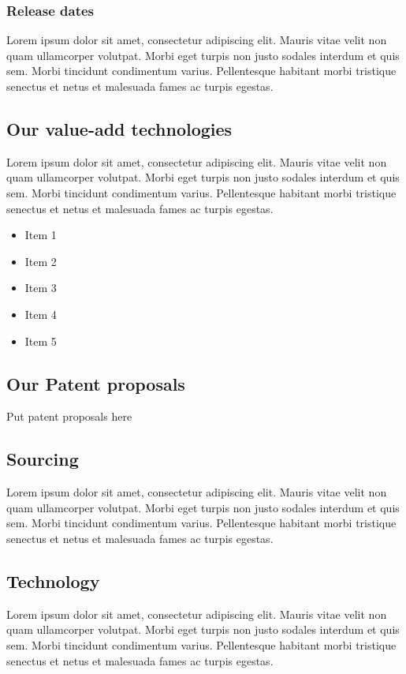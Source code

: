 \documentclass[11pt,titlepage]{article}
\begin{document}
\subsubsection{Release dates}
Lorem ipsum dolor sit amet, consectetur adipiscing elit. Mauris vitae velit 
non quam ullamcorper volutpat. Morbi eget turpis non justo sodales interdum 
et quis sem. Morbi tincidunt condimentum varius. Pellentesque habitant morbi 
tristique senectus et netus et malesuada fames ac turpis egestas.\newline

\subsection{Our value-add technologies}
Lorem ipsum dolor sit amet, consectetur adipiscing elit. Mauris vitae velit 
non quam ullamcorper volutpat. Morbi eget turpis non justo sodales interdum 
et quis sem. Morbi tincidunt condimentum varius. Pellentesque habitant morbi 
tristique senectus et netus et malesuada fames ac turpis egestas.\newline
\begin{itemize}
\item Item 1
\item Item 2
\item Item 3
\item Item 4
\item Item 5
\end{itemize}

\subsection{Our Patent proposals}
Put patent proposals here\newline

\subsection{Sourcing}
Lorem ipsum dolor sit amet, consectetur adipiscing elit. Mauris vitae velit 
non quam ullamcorper volutpat. Morbi eget turpis non justo sodales interdum 
et quis sem. Morbi tincidunt condimentum varius. Pellentesque habitant morbi 
tristique senectus et netus et malesuada fames ac turpis egestas.\newline
\subsection{Technology}
Lorem ipsum dolor sit amet, consectetur adipiscing elit. Mauris vitae velit 
non quam ullamcorper volutpat. Morbi eget turpis non justo sodales interdum 
et quis sem. Morbi tincidunt condimentum varius. Pellentesque habitant morbi 
tristique senectus et netus et malesuada fames ac turpis egestas.\newline
\end{document}
